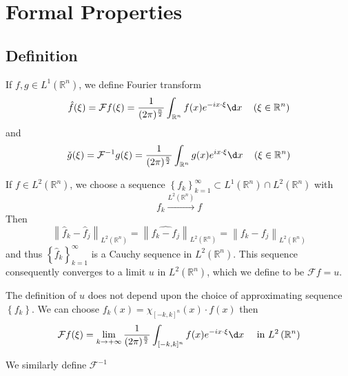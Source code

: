 \documentclass[12pt, a4paper, oneside]{book}
\begin{document}
\section{Formal Properties}

\subsection{Definition}
\begin{definition}
    If $f, g\in L^1(\mathbb{R}^n)$, we define Fourier transform
    \begin{equation*}
        \hat{f} (\xi )
        = \mathcal{F}f (\xi)
        = \frac{1}{(2\pi)^{\frac{n}{2}}} \int_{\mathbb{R}^n} f(x) e^{-i x \cdot \xi} \d  x \quad \left(\xi \in \mathbb{R}^n \right)
    \end{equation*}
    and
    $$
        \check{g} (\xi)
        =\mathcal{F}^{-1} g (\xi)
        = \frac{1}{(2\pi)^{\frac{n}{2}}}
        \int_{\mathbb{R}^n}
        g(x) e^{i x \cdot \xi} \d  x \quad \left(\xi \in \mathbb{R}^n \right)$$
\end{definition}
\begin{definition}
    If $f\in L^2(\mathbb{R}^n)$, we choose a sequence $\left\{f_k\right\}_{k=1}^{\infty} \subset L^1\left(\mathbb{R}^n\right) \cap L^2\left(\mathbb{R}^n\right)$ with
    $$
        f_k \xrightarrow{L^2(\mathbb{R}^n)} f
    $$
    Then
    $$\left\|\hat{f}_k-\hat{f}_j\right\|_{L^2\left(\mathbb{R}^n\right)}
        =\left\|\widehat{f_k-f_j}\right\|_{L^2\left(\mathbb{R}^n\right)}
        =\left\|f_k-f_j\right\|_{L^2\left(\mathbb{R}^n\right)}$$
    and thus $\left\{\hat{f}_k\right\}_{k=1}^{\infty}$ is a Cauchy sequence in $L^2\left(\mathbb{R}^n\right)$. This sequence consequently converges to a limit $u$ in $L^2\left(\mathbb{R}^n\right)$, which we define to be $\mathcal{F} f=u$.

    The definition of $u$ does not depend upon the choice of approximating sequence $\left\{f_k\right\}$. We can choose $f_k(x)= \chi_{[-k,k]^n} (x) \cdot f(x)$
    then
    $$\mathcal{F}f (\xi)
        =\lim_{k \to +\infty} \frac{1}{(2\pi)^{\frac{n}{2}}} \int_{[-k,k]^n} f(x) e^{-i x \cdot \xi} \d x \quad \text{ in } L^2\left(\mathbb{R}^n\right)
    $$

    We similarly define $\mathcal{F}^{-1}$
\end{definition}
\end{document}
